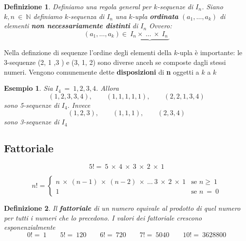 \documentclass[12pt, a4paper]{article}
\theoremstyle{break}
\newtheorem{defn}{Definizione}
\theoremstyle{lemma}
\theoremstyle{lemma}
\theoremstyle{lemma}
\newtheorem{esem}{Esempio}
\begin{document}
\begin{defn}
  Definiamo una regola general per $k$-sequenze di $I_n$.
  Siano $k,n\ \in\ \mathbb{N}$ definiamo $k$-sequenza di $I_n$ una $k$-upla \textbf{ordinata} $(a_1,\ldots ,a_k)$ di elementi \textbf{non necessariamente distinti} di $I_n$ Ovvero:
  \begin{equation}
    (a_1,\ldots,a_k)\in\ \underbrace{I_n\times\ \ldots\ \times\ I_n\ }
  \end{equation}
\end{defn}

Nella definzione di sequenze l'ordine degli elementi della $k$-upla è importante: le 3-sequenze (2, 1 ,3 ) e (3, 1, 2) sono diverse anceh se composte dagli stessi numeri. Vengono comunemente dette \textbf{disposizioni} di \textbf{n} oggetti a $k$ a $k$

\begin{esem}
  Sia $I_4\ =\ {1,2,3,4}$. Allora
  \begin{equation}
    (1,2,3,3,4),\qquad (1,1,1,1,1),\qquad (2,2,1,3,4)
  \end{equation}
  sono 5-sequenze di $I_4$. Invece
  \begin{equation}
    (1,2,3),\qquad (1,1,1),\qquad (2,3,4)
  \end{equation}
  sono 3-sequenze di $I_4$
\end{esem}

\subsection{Fattoriale}

\begin{equation}
  5!=\ 5\ \times\ 4\ \times\ 3\ \times\ 2\ \times\ 1
\end{equation}

\begin{equation}
  n!=
  \begin{cases}
    n\ \times\ (n-1)\ \times\ (n-2)\ \times\ \ldots\ 3\ \times\ 2\
    \times\ 1 &  \mbox{se } n\geq\ 1 \\
    1 &  \mbox{se }n\ =\ 0
  \end{cases}
\end{equation}

\begin{defn}
  Il \textbf{fattoriale} di un numero equivale al prodotto di quel numero per tutti i numeri che lo precedono. I valori dei fattoriale crescono esponenzialmente
  \begin{equation}
    0!=\ 1 \qquad 5!=\ 120 \qquad 6!=\ 720 \qquad 7!=\ 5040 \qquad 10!=\ 3628800
  \end{equation}
\end{defn}
\end{document}
